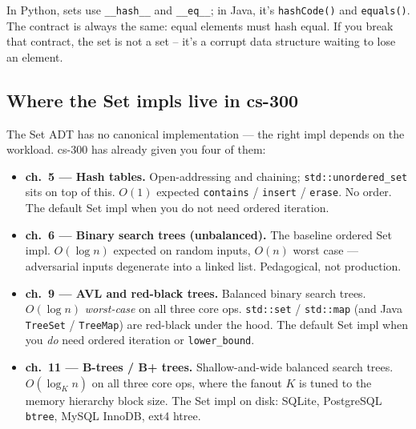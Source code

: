 \documentclass[11pt]{article}
\begin{document}
\begin{notebox}
In Python, sets use \texttt{\_\_hash\_\_} and \texttt{\_\_eq\_\_}; in Java, it's \texttt{hashCode()} and \texttt{equals()}. The contract is always the same: equal elements must hash equal. If you break that contract, the set is not a set -- it's a corrupt data structure waiting to lose an element.
\end{notebox}

\subsection*{Where the Set impls live in cs-300}

The Set ADT has no canonical implementation --- the right impl
depends on the workload. cs-300 has already given you four of them:

\begin{notebox}
\begin{itemize}[leftmargin=*]
    \item \textbf{ch.~5 --- Hash tables.} Open-addressing and
          chaining; \texttt{std::unordered\_set} sits on top of
          this. $O(1)$ expected \texttt{contains} / \texttt{insert}
          / \texttt{erase}. No order. The default Set impl when
          you do not need ordered iteration.
    \item \textbf{ch.~6 --- Binary search trees (unbalanced).} The
          baseline ordered Set impl. $O(\log n)$ expected on random
          inputs, $O(n)$ worst case --- adversarial inputs degenerate
          into a linked list. Pedagogical, not production.
    \item \textbf{ch.~9 --- AVL and red-black trees.} Balanced
          binary search trees. $O(\log n)$ \emph{worst-case} on all
          three core ops. \texttt{std::set} / \texttt{std::map}
          (and Java \texttt{TreeSet} / \texttt{TreeMap}) are
          red-black under the hood. The default Set impl when you
          \emph{do} need ordered iteration or \texttt{lower\_bound}.
    \item \textbf{ch.~11 --- B-trees / B+ trees.} Shallow-and-wide
          balanced search trees. $O(\log_K n)$ on all three core
          ops, where the fanout $K$ is tuned to the memory
          hierarchy block size. The Set impl on disk: SQLite,
          PostgreSQL \texttt{btree}, MySQL InnoDB, ext4 htree.
\end{itemize}
\end{notebox}
\end{document}
